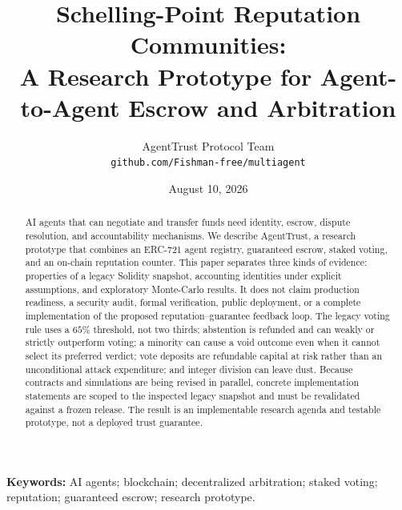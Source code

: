 \documentclass[11pt]{article}
\title{\textbf{Schelling-Point Reputation Communities:\\A Research Prototype for Agent-to-Agent Escrow and Arbitration}}
\author{AgentTrust Protocol Team\\[2pt]
  \small \texttt{github.com/Fishman-free/multiagent}}
\date{August 10, 2026}
\begin{document}
\maketitle

\begin{abstract}
AI agents that can negotiate and transfer funds need identity, escrow, dispute resolution, and
accountability mechanisms. We describe AgentTrust, a research prototype that combines an ERC-721
agent registry, guaranteed escrow, staked voting, and an on-chain reputation counter. This paper
separates three kinds of evidence: properties of a legacy Solidity snapshot, accounting identities
under explicit assumptions, and exploratory Monte-Carlo results. It does not claim production
readiness, a security audit, formal verification, public deployment, or a complete implementation of
the proposed reputation--guarantee feedback loop. The legacy voting rule uses a $65\%$ threshold,
not two thirds; abstention is refunded and can weakly or strictly outperform voting; a minority can
cause a void outcome even when it cannot select its preferred verdict; vote deposits are refundable
capital at risk rather than an unconditional attack expenditure; and integer division can leave dust.
Because contracts and simulations are being revised in parallel, concrete implementation statements
are scoped to the inspected legacy snapshot and must be revalidated against a frozen release. The
result is an implementable research agenda and testable prototype, not a deployed trust guarantee.
\end{abstract}

{\small
\noindent\textbf{Keywords:} AI agents; blockchain; decentralized arbitration; staked voting;
reputation; guaranteed escrow; research prototype.
}










\end{document}
